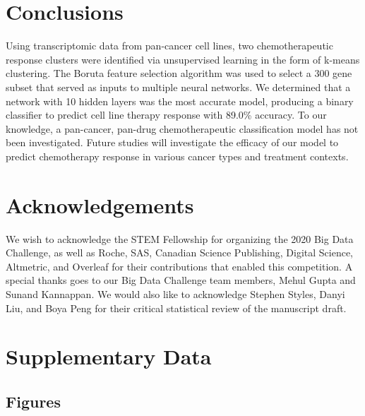 \documentclass[10pt, letterpaper, twocolumn]{article}
\begin{document}
\section{Conclusions}
Using transcriptomic data from pan-cancer cell lines, two chemotherapeutic response clusters were identified via unsupervised learning in the form of k-means clustering. The Boruta feature selection algorithm was used to select a 300 gene subset that served as inputs to multiple neural networks. We determined that a network with 10 hidden layers was the most accurate model, producing a binary classifier to predict cell line therapy response with 89.0\% accuracy. To our knowledge, a pan-cancer, pan-drug chemotherapeutic classification model has not been investigated. Future studies will investigate the efficacy of our model to predict chemotherapy response in various cancer types and treatment contexts.


\section*{Acknowledgements}
We wish to acknowledge the STEM Fellowship for organizing the 2020 Big Data Challenge, as well as Roche, SAS, Canadian Science Publishing, Digital Science, Altmetric, and Overleaf for their contributions that enabled this competition. A special thanks goes to our Big Data Challenge team members, Mehul Gupta and Sunand Kannappan. We would also like to acknowledge Stephen Styles, Danyi Liu, and Boya Peng for their critical statistical review of the manuscript draft.




\clearpage

\onecolumn
\renewcommand{\thepage}{S\arabic{page}}
\renewcommand{\thesection}{S}
\renewcommand{\thetable}{S\arabic{table}}
\renewcommand{\thefigure}{S\arabic{figure}}
\setcounter{figure}{0}

\section{Supplementary Data}
\subsection{Figures}
\end{document}
